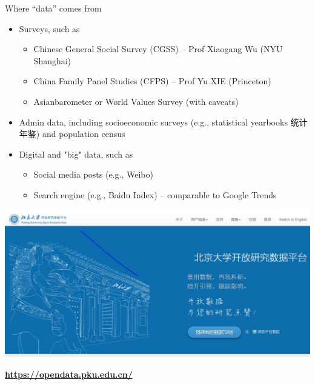 \documentclass[
  10pt,
  ignorenonframetext,
]{beamer}
\begin{document}
\begin{frame}{Where ``data'' comes from}
\label{where-data-comes-from}
\begin{itemize}
  \item Surveys, such as
  \vspace{0.1cm}
  \begin{itemize}
    \item Chinese General Social Survey (CGSS) -- Prof Xiaogang Wu (NYU Shanghai)
    \item China Family Panel Studies (CFPS) -- Prof Yu XIE (Princeton)
    \item Asianbarometer or World Values Survey (with caveats)
  \end{itemize}
  \vspace{0.2cm}
  \item Admin data, including socioeconomic surveys (e.g., statistical yearbooks 统计年鉴) and population census
  \vspace{0.2cm}
  \item Digital and "big" data, such as
  \vspace{0.1cm}
  \begin{itemize}
    \item Social media posts (e.g., Weibo)
    \item Search engine (e.g., Baidu Index) -- comparable to Google Trends
  \end{itemize}
\end{itemize}
\end{frame}

\begin{frame}
\vspace{0.4cm}

\begin{center}\includegraphics[width=0.9\linewidth]{Figs/pkuverse_crop} \end{center}
\vspace{0.3cm}
\begin{center}
\textbf{\url{https://opendata.pku.edu.cn/}}
\end{center}
\end{frame}
\end{document}
